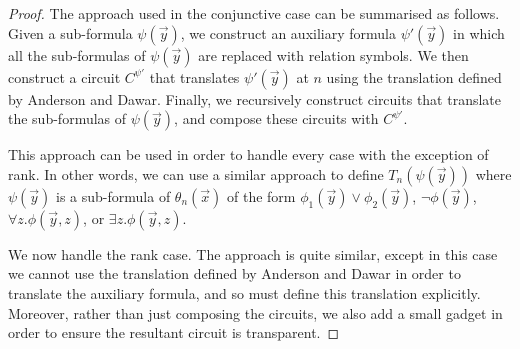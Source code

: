 \documentclass[../paper.tex]{subfiles}
\begin{document}
\begin{proof}
  The approach used in the conjunctive case can be summarised as follows. Given
  a sub-formula $\psi (\vec{y})$, we construct an auxiliary formula
  $\psi'(\vec{y})$ in which all the sub-formulas of $\psi(\vec{y})$ are replaced
  with relation symbols. We then construct a circuit $C^{\psi'}$ that translates
  $\psi'(\vec{y})$ at $n$ using the translation defined by Anderson and Dawar.
  Finally, we recursively construct circuits that translate the sub-formulas of
  $\psi(\vec{y})$, and compose these circuits with $C^{\psi'}$.
  
  This approach can be used in order to handle every case with the exception of
  rank. In other words, we can use a similar approach to define
  $T_n(\psi(\vec{y}))$ where $\psi(\vec{y})$ is a sub-formula of
  $\theta_n(\vec{x})$ of the form $\phi_1(\vec{y}) \lor \phi_2(\vec{y})$, $\neg
  \phi(\vec{y})$, $\forall z. \phi (\vec{y}, z)$, or $\exists z. \phi (\vec{y},
  z)$.

  We now handle the rank case. The approach is quite similar, except in this
  case we cannot use the translation defined by Anderson and Dawar in order to
  translate the auxiliary formula, and so must define this translation
  explicitly. Moreover, rather than just composing the circuits, we also add a
  small gadget in order to ensure the resultant circuit is transparent.
  

\end{proof}
\end{document}
